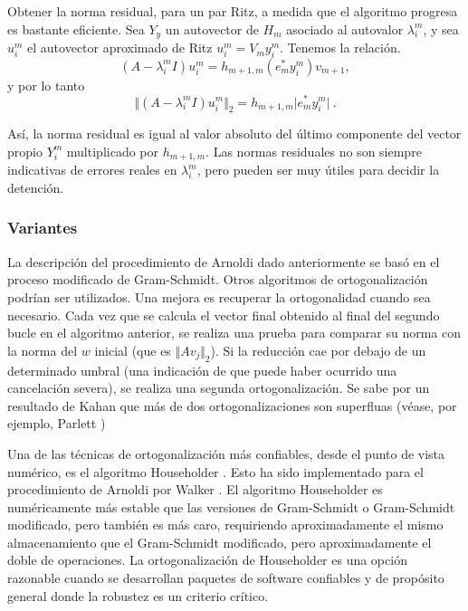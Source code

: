 \documentclass[a4paper,openright,12pt, oneside]{book}
\begin{document}
Obtener la norma residual, para un par Ritz, a medida que el algoritmo progresa es bastante eficiente. Sea $Y_y $ un autovector de $ H_m $ asociado al autovalor $ \lambda_i ^ {m} $, y sea $ u_i ^ {m} $ el autovector aproximado de Ritz $ u_i ^ {m} = V_m y_i ^ {m} $. Tenemos la relaci\'on.
\begin{displaymath}
(A - \lambda_i ^{m}I ) u_i ^{m}= h_{m+1,m}(e_m^{\ast} y_i^{m})v_{m+1},
\end{displaymath}
y por lo tanto
\begin{displaymath}
\Vert ( A - \lambda_i ^{m}I ) u_i ^{m}\Vert _2 = h_{m+1,m} \vert e_m^{\ast} y_i
^{m}\vert \ .
\end{displaymath}

As\'i, la norma residual es igual al valor absoluto del \'ultimo componente del vector propio $
Y_i ^ {m} $ multiplicado por $ h_ {m + 1, m} $. Las normas residuales no son siempre indicativas de errores reales en $ \lambda_i ^ {m} $, pero pueden ser muy \'utiles para decidir la detenci\'on.

\subsubsection{Variantes}

La descripci\'on del procedimiento de Arnoldi dado anteriormente se bas\'o en el proceso modificado de Gram-Schmidt. Otros algoritmos de ortogonalizaci\'on podr\'ian ser utilizados. Una mejora es recuperar la ortogonalidad cuando sea necesario. Cada vez que se calcula el vector final obtenido al final del segundo bucle en el algoritmo anterior, se realiza una prueba para comparar su norma con la norma del $ w $ inicial (que es $ \Vert A v_j \Vert_2 $). Si la reducci\'on cae por debajo de un determinado umbral (una indicaci\'on de que puede haber ocurrido una cancelaci\'on severa), se realiza una segunda ortogonalizaci\'on. Se sabe por un resultado de Kahan que m\'as de dos ortogonalizaciones son superfluas (v\'ease, por ejemplo, Parlett \cite{Parlett})

Una de las t\'ecnicas de ortogonalizaci\'on m\'as confiables, desde el punto de vista num\'erico, es el algoritmo Householder \cite{Householder}. Esto ha sido implementado para el procedimiento de Arnoldi por Walker \cite{Householder2}. El algoritmo Householder es num\'ericamente m\'as estable que las versiones de Gram-Schmidt o Gram-Schmidt modificado, pero tambi\'en es m\'as caro, requiriendo aproximadamente el mismo almacenamiento que el Gram-Schmidt modificado, pero aproximadamente el doble de operaciones. La ortogonalizaci\'on de Householder es una opci\'on razonable cuando se desarrollan paquetes de software confiables y de prop\'osito general donde la robustez es un criterio cr\'itico.
\end{document}

